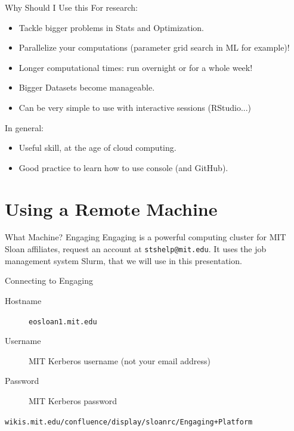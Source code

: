 \documentclass{beamer}
\begin{document}
\begin{frame}{Why Should I Use this}
  For research:
  \begin{itemize}
    \item Tackle \alert{bigger problems} in Stats and Optimization.
    \item \alert{Parallelize} your computations (parameter grid search in ML for example)!
    \item Longer computational times: \alert{run overnight} or for a whole week!
    \item \alert{Bigger Datasets} become manageable.
    \item Can be very simple to use with interactive sessions (\alert{RStudio}...)
  \end{itemize}
  In general:
  \begin{itemize}
    \item \alert{Useful skill}, at the age of cloud computing.
    \item \alert{Good practice} to learn how to use console (and GitHub).
  \end{itemize}
\end{frame}

\section{Using a Remote Machine}
\begin{frame}{What Machine? Engaging}
  Engaging is a powerful computing cluster for MIT Sloan affiliates, request an account at \texttt{stshelp@mit.edu}. It uses the job management system \alert{Slurm}, that we will use in this presentation.
  \vspace{1cm}
  \begin{block}{Connecting to Engaging}
    \begin{description}
      \item[Hostname] \texttt{eosloan1.mit.edu}
      \item[Username] MIT Kerberos username (not your email address)
      \item[Password] MIT Kerberos password
    \end{description}
    \texttt{wikis.mit.edu/confluence/display/sloanrc/Engaging+Platform}
  \end{block}
\end{frame}
\end{document}
